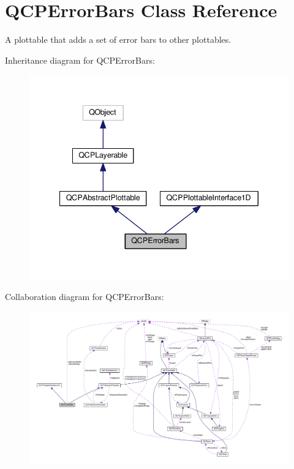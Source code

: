 \hypertarget{classQCPErrorBars}{}\section{Q\+C\+P\+Error\+Bars Class Reference}
\label{classQCPErrorBars}


A plottable that adds a set of error bars to other plottables.  




Inheritance diagram for Q\+C\+P\+Error\+Bars\+:
\nopagebreak
\begin{figure}[H]
\begin{center}
\leavevmode
\includegraphics[width=340pt]{classQCPErrorBars__inherit__graph}
\end{center}
\end{figure}


Collaboration diagram for Q\+C\+P\+Error\+Bars\+:
\nopagebreak
\begin{figure}[H]
\begin{center}
\leavevmode
\includegraphics[width=350pt]{classQCPErrorBars__coll__graph}
\end{center}
\end{figure}
